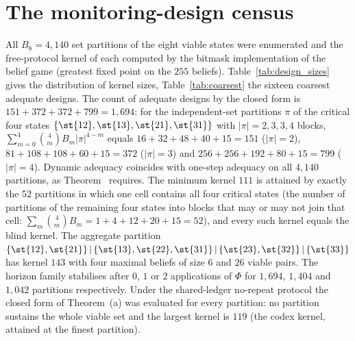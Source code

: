 \section{The monitoring-design census}\label{si:design}

All $B_8=4{,}140$ set partitions of the eight viable states were enumerated and the free-protocol kernel of each computed by the bitmask implementation of the belief game (greatest fixed point on the $255$ beliefs). Table~\ref{tab:design_sizes} gives the distribution of kernel sizes, Table~\ref{tab:coarsest} the sixteen coarsest adequate designs. The count of adequate designs by the closed form  is $151+372+372+799=1{,}694$: for the independent-set partitions $\pi$ of the critical four states $\{\st{12},\st{13},\st{21},\st{31}\}$ with $|\pi|=2,3,3,4$ blocks, $\sum_{m=0}^{4}\binom4m B_m|\pi|^{4-m}$ equals $16+32+48+40+15=151$ ($|\pi|=2$), $81+108+108+60+15=372$ ($|\pi|=3$) and $256+256+192+80+15=799$ ($|\pi|=4$). Dynamic adequacy coincides with one-step adequacy on all $4{,}140$ partitions, as Theorem~ requires. The minimum kernel $111$ is attained by exactly the $52$ partitions in which one cell contains all four critical states (the number of partitions of the remaining four states into blocks that may or may not join that cell: $\sum_m\binom4m B_m=1+4+12+20+15=52$), and every such kernel equals the blind kernel. The aggregate partition $\{\st{12},\st{21}\}\,|\,\{\st{13},\st{22},\st{31}\}\,|\,\{\st{23},\st{32}\}\,|\,\{\st{33}\}$ has kernel $143$ with four maximal beliefs of size $6$ and $26$ viable pairs. The horizon family stabilises after $0$, $1$ or $2$ applications of $\Phi$ for $1{,}694$, $1{,}404$ and $1{,}042$ partitions respectively. Under the shared-ledger no-repeat protocol the closed form of Theorem~(a) was evaluated for every partition: no partition sustains the whole viable set and the largest kernel is $119$ (the codex kernel, attained at the finest partition).



